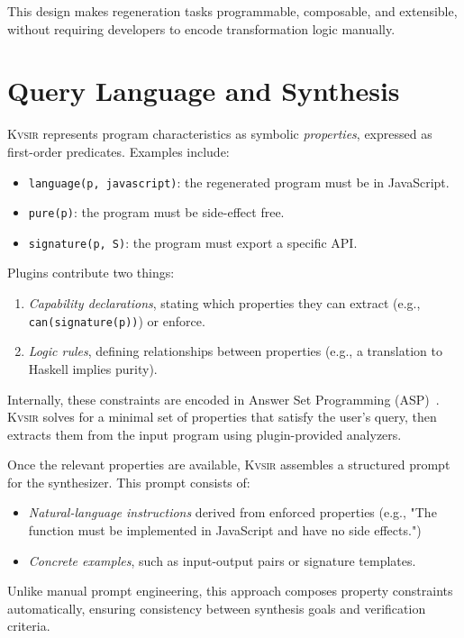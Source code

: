 \documentclass[sigplan,review,anonymous,10pt]{acmart}
\newcommand{\sys}{{\scshape Kv{\textalpha}sir}\xspace}
\begin{document}
This design makes regeneration tasks programmable, composable, and extensible, without requiring developers to encode transformation logic manually.

\section{Query Language and Synthesis}
\label{sec:synthesis}

\sys represents program characteristics as symbolic \emph{properties}, expressed as first-order predicates. Examples include:

\begin{itemize}
  \item \texttt{language(p, javascript)}: the regenerated program must be in JavaScript.
  \item \texttt{pure(p)}: the program must be side-effect free.
  \item \texttt{signature(p, S)}: the program must export a specific API.
\end{itemize}

Plugins contribute two things:
\begin{enumerate}
  \item \emph{Capability declarations}, stating which properties they can extract (e.g., \texttt{can(signature(p))}) or enforce.
  \item \emph{Logic rules}, defining relationships between properties (e.g., a translation to Haskell implies purity).
\end{enumerate}

Internally, these constraints are encoded in Answer Set Programming (ASP)~\cite{Gelfond_2000, Eiter_2009}. \sys solves for a minimal set of properties that satisfy the user’s query, then extracts them from the input program using plugin-provided analyzers.

Once the relevant properties are available, \sys assembles a structured prompt for the synthesizer. This prompt consists of:

\begin{itemize}
  \item \emph{Natural-language instructions} derived from enforced properties (e.g., "The function must be implemented in JavaScript and have no side effects.")
  \item \emph{Concrete examples}, such as input-output pairs or signature templates.
\end{itemize}

Unlike manual prompt engineering, this approach composes property constraints automatically, ensuring consistency between synthesis goals and verification criteria.
\end{document}
